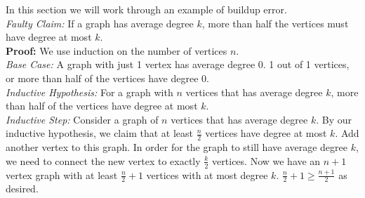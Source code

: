 In this section we will work through an example of buildup error. \\ 
\textit{Faulty Claim:} If a graph has average degree $k$, more than half the vertices must have degree at most $k$.\\
\textbf{Proof:} We use induction on the number of vertices $n$. \\
\textit{Base Case:} A graph with just 1 vertex has average degree $0$. 1 out of 1 vertices, or more than half of the vertices have degree 0. \\
\textit{Inductive Hypothesis:} For a graph with $n$ vertices that has average degree $k$, more than half of the vertices have degree at most $k$.\\
\textit{Inductive Step:} Consider a graph of $n$ vertices that has average degree $k$. By our inductive hypothesis, we claim that at least $\frac{n}{2}$ vertices have degree at most $k$. Add another vertex to this graph. In order for the graph to still have average degree $k$, we need to connect the new vertex to exactly $\frac{k}{2}$ vertices. Now we have an $n+1$ vertex graph with at least $\frac{n}{2} + 1$ vertices with at most degree $k$. $\frac{n}{2} + 1 \geq \frac{n+1}{2}$ as desired.

